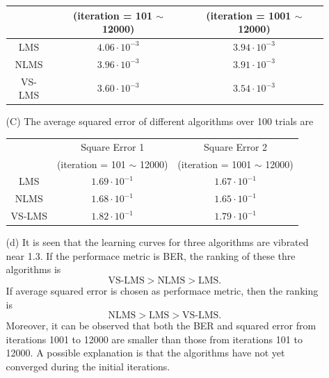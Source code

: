 \documentclass[letterpaper,12pt]{article}
\begin{document}
\begin{enumerate}
\begin{itemize}
\begin{table}[H]
\begin{tabular}{c|c|c}
                    & (iteration = 101 $\sim$ 12000) & (iteration = 1001 $\sim$ 12000) \\
                    \hline
          LMS    & $4.06 \cdot 10^{-3}$ &  $3.94 \cdot 10^{-3}$     \\
          \hline
          NLMS   & $3.96 \cdot 10^{-3}$ &  $3.91 \cdot 10^{-3}$     \\
          \hline
          VS-LMS & $3.60 \cdot 10^{-3}$ &  $3.54 \cdot 10^{-3}$     
        \end{tabular}
      \end{table}
      \item[(C)] The average squared error of different algorithms over 100 trials are
      \begin{table}[H]
        \centering
        \begin{tabular}{c|c|c}
                    & Square Error 1                 & Square Error 2 \\
                    & (iteration = 101 $\sim$ 12000) & (iteration = 1001 $\sim$ 12000) \\
                    \hline
          LMS    & $1.69 \cdot 10^{-1}$ &  $1.67 \cdot 10^{-1}$     \\
          \hline
          NLMS   & $1.68 \cdot 10^{-1}$ &  $1.65 \cdot 10^{-1}$     \\
          \hline
          VS-LMS & $1.82 \cdot 10^{-1}$ &  $1.79 \cdot 10^{-1}$     
        \end{tabular}
      \end{table}
      \item[(d)] It is seen that the learning curves for three algorithms are vibrated near 1.3.
      If the performace metric is BER, the ranking of these thre algorithms is
      \begin{equation*}
        \text{VS-LMS} > \text{NLMS} > \text{LMS}.
      \end{equation*}
      If average squared error is chosen as performace metric, then the ranking is
      \begin{equation*}
        \text{NLMS} > \text{LMS} > \text{VS-LMS}.
      \end{equation*}
      Moreover, it can be observed that both the BER and squared error from iterations 1001 to 12000 are 
      smaller than those from iterations 101 to 12000. A possible explanation is that the algorithms have 
      not yet converged during the initial iterations.
    \end{itemize}
  \end{enumerate}
  
\end{document}
